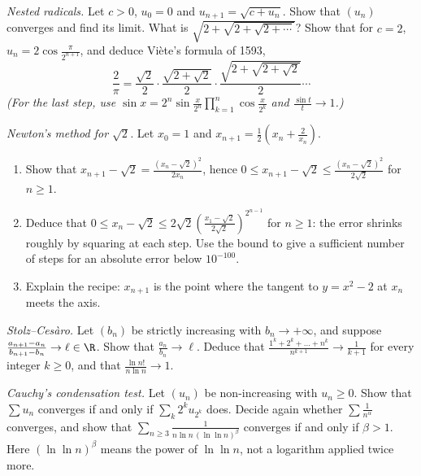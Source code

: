 \begin{exercise}[$\star$]\label{ex:nested}
\emph{Nested radicals.} Let $c>0$, $u_0=0$ and $u_{n+1}=\sqrt{c+u_n}$. Show that $(u_n)$ converges and find its limit. What is $\sqrt{2+\sqrt{2+\sqrt{2+\cdots}}}$? Show that for $c=2$, $u_n=2\cos\frac\pi{2^{n+1}}$, and deduce Vi\`ete's formula of 1593,
\[
\frac2\pi=\frac{\sqrt2}2\cdot\frac{\sqrt{2+\sqrt2}}2\cdot\frac{\sqrt{2+\sqrt{2+\sqrt2}}}2\cdots
\]
\emph{(For the last step, use $\sin x=2^n\sin\frac x{2^n}\prod_{k=1}^n\cos\frac x{2^k}$ and $\frac{\sin t}t\to1$.)}
\end{exercise}

\begin{exercise}[$\star\star$]\label{ex:newton}
\emph{Newton's method for $\sqrt2$.} Let $x_0=1$ and $x_{n+1}=\frac12\left(x_n+\frac2{x_n}\right)$.
\begin{enumerate}[label=(\alph*)]
\item Show that $x_{n+1}-\sqrt2=\frac{(x_n-\sqrt2)^2}{2x_n}$, hence $0\le x_{n+1}-\sqrt2\le\frac{(x_n-\sqrt2)^2}{2\sqrt2}$ for $n\ge1$.
\item Deduce that $0\le x_n-\sqrt2\le2\sqrt2\left(\frac{x_1-\sqrt2}{2\sqrt2}\right)^{2^{n-1}}$ for $n\ge1$: the error shrinks roughly by squaring at each step. Use the bound to give a sufficient number of steps for an absolute error below $10^{-100}$.
\item Explain the recipe: $x_{n+1}$ is the point where the tangent to $y=x^2-2$ at $x_n$ meets the axis.
\end{enumerate}
\end{exercise}

\begin{exercise}[$\star\star$]\label{ex:stolz}
\emph{Stolz--Ces\`aro.} Let $(b_n)$ be strictly increasing with $b_n\to+\infty$, and suppose $\frac{a_{n+1}-a_n}{b_{n+1}-b_n}\to\ell\in\R$. Show that $\frac{a_n}{b_n}\to\ell$.
Deduce that $\frac{1^k+2^k+\dots+n^k}{n^{k+1}}\to\frac1{k+1}$ for every integer $k\ge0$, and that $\frac{\ln n!}{n\ln n}\to1$.
\end{exercise}

\begin{exercise}[$\star\star$]\label{ex:condensation}
\emph{Cauchy's condensation test.} Let $(u_n)$ be non-increasing with $u_n\ge0$. Show that $\sum u_n$ converges if and only if $\sum_k2^ku_{2^k}$ does. Decide again
whether $\sum\frac1{n^\alpha}$ converges, and show that $\sum_{n\ge3}\frac1{n\ln n\,(\ln\ln n)^\beta}$ converges if and only if $\beta>1$. Here $(\ln\ln n)^\beta$ means the power of $\ln\ln n$, not a logarithm applied twice more.
\end{exercise}

